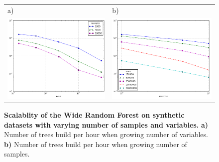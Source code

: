 \documentclass[10pt,letterpaper]{article}
\begin{document}
\begin{figure}[tbhp]
\begin{adjustwidth}{-1.00in}{0in}
\begin{tabular}{ll}
a)& b)\\
\includegraphics[totalheight=6cm]{./figs/nvars_nsamples.png} & 
\includegraphics[totalheight=6cm]{./figs/nsamples_nvars.png} \\
\end{tabular}
\caption{{\bf Scalablity of the Wide Random Forest on synthetic datasets with varying number of samples and variables.} 
  {\bf a)} Number of trees build per hour when growing number of variables. 
  {\bf b)} Number of trees build per hour when growing number of samples.}
\label{figure:synth}
\end{adjustwidth}
\end{figure}
\end{document}
